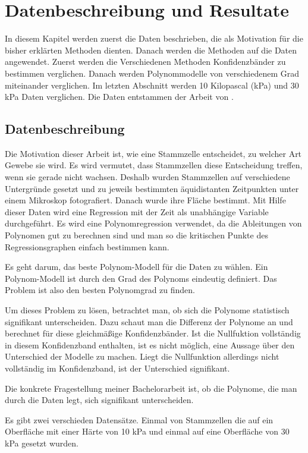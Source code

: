 \documentclass[12pt,a4paper]{article}
\theoremstyle{definition}
\theoremstyle{definition}
\theoremstyle{definition}
\theoremstyle{definition}
\begin{document}
\newpage
\section{Datenbeschreibung und Resultate}
In diesem Kapitel werden zuerst die Daten beschrieben, die als Motivation für die bisher erklärten Methoden dienten. Danach werden die Methoden auf die Daten angewendet. Zuerst werden die Verschiedenen Methoden Konfidenzbänder zu bestimmen verglichen. Danach werden Polynommodelle von verschiedenem Grad miteinander verglichen. Im letzten Abschnitt werden 10 Kilopascal (kPa) und 30 kPa Daten verglichen. Die Daten entstammen der Arbeit von \cite{Rehfeldt10}.

\subsection{Datenbeschreibung}
Die Motivation dieser Arbeit ist, wie eine Stammzelle entscheidet, zu welcher Art Gewebe sie wird. Es wird vermutet, dass Stammzellen diese Entscheidung treffen, wenn sie gerade nicht wachsen. Deshalb wurden Stammzellen auf verschiedene Untergründe gesetzt und zu jeweils bestimmten äquidistanten Zeitpunkten unter einem Mikroskop fotografiert. Danach wurde ihre Fläche bestimmt. Mit Hilfe dieser Daten wird eine Regression mit der Zeit als unabhängige Variable durchgeführt. Es wird eine Polynomregression verwendet, da die Ableitungen von Polynomen gut zu berechnen sind und man so die kritischen Punkte des Regressionsgraphen einfach bestimmen kann.

Es geht darum, das beste Polynom-Modell für die Daten zu wählen. Ein Polynom-Modell ist durch den Grad des Polynoms eindeutig definiert. Das Problem ist also den besten Polynomgrad zu finden.

Um dieses Problem zu lösen, betrachtet man, ob sich die Polynome statistisch signifikant unterscheiden. Dazu schaut man die Differenz der Polynome an und berechnet für diese gleichmäßige Konfidenzbänder. Ist die Nullfuktion vollständig in diesem Konfidenzband enthalten, ist es nicht möglich, eine Aussage über den Unterschied der Modelle zu machen. Liegt die Nullfunktion allerdings nicht vollständig im Konfidenzband, ist der Unterschied signifikant.

Die konkrete Fragestellung meiner Bachelorarbeit ist, ob die Polynome, die man durch die Daten legt, sich signifikant unterscheiden.

Es gibt zwei verschieden Datensätze. Einmal von Stammzellen die auf ein Oberfläche mit einer Härte von 10 kPa und einmal auf eine Oberfläche von 30 kPa gesetzt wurden. 
\end{document}
